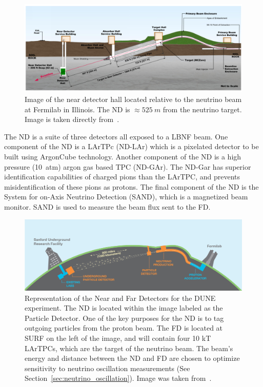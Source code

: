 \begin{figure}[]
\centering
\includegraphics[width=\textwidth]{images/dune_nd_beamline_tdrv1.png}
\caption{Image of the near detector hall located relative to the neutrino beam at Fermilab in Illinois.
The ND is $\approx 525~\unit{m}$ from the neutrino target.
Image is taken directly from~\citep{DUNE_TDR_V1_Abi_2020}.
}
\label{fig:dune_nd_beamline}
\end{figure}

The ND is a suite of three detectors all exposed to a LBNF beam.
One component of the ND is a LArTPc (ND-LAr) which is a pixelated detector to be built using ArgonCube technology.
Another component of the ND is a high pressure (10~\unit{atm}) argon gas based TPC (ND-GAr).
The ND-Gar has superior identification capabilities of charged pions than the LArTPC, and prevents misidentification of these pions as protons.
The final component of the ND is the System for on-Axis Neutrino Detection (SAND), which is a magnetized beam monitor.
SAND is used to measure the beam flux sent to the FD.

\begin{figure}[]
\centering
\includegraphics[width=\textwidth]{images/LBNE_Graphic_061615_2016.jpg}
\caption{Representation of the Near and Far Detectors for the DUNE experiment.
The ND is located within the image labeled as the Particle Detector.
One of the key purposes for the ND is to tag outgoing particles from the proton beam.
The FD is located at SURF on the left of the image, and will contain four 10 kT LArTPCs, which are the target of the neutrino beam.
The beam's energy and distance between the ND and FD are chosen to optimize sensitivity to neutrino oscillation measurements (See Section~\ref{sec:neutrino_oscillation}).
Image was taken from~\citep{dune_cdr_2016_arxiv}.}
\label{fig:dune_fd_image}
\end{figure}


